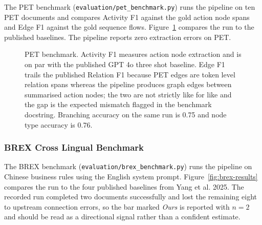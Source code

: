 \documentclass{article}
\begin{document}
The PET benchmark (\texttt{evaluation/pet\_benchmark.py}) runs the
pipeline on ten PET documents and compares Activity F1 against the
gold action node spans and Edge F1 against the gold sequence flows.
Figure~\ref{fig:pet-results} compares the run to the published
baselines. The pipeline reports zero extraction errors on PET.

\begin{figure}[H]
\centering
{}
\caption{PET benchmark. Activity F1 measures action node extraction
and is on par with the published GPT 4o three shot baseline. Edge
F1 trails the published Relation F1 because PET edges are
token level relation spans whereas the pipeline produces graph
edges between summarised action nodes; the two are not strictly
like for like and the gap is the expected mismatch flagged in the
benchmark docstring. Branching accuracy on the same run is 0.75
and node type accuracy is 0.76.}
\label{fig:pet-results}
\end{figure}

\subsubsection{BREX Cross Lingual Benchmark}

The BREX benchmark (\texttt{evaluation/brex\_benchmark.py}) runs the
pipeline on Chinese business rules using the English system prompt.
Figure~\ref{fig:brex-results} compares the run to the four published
baselines from Yang et al. 2025. The recorded run completed two
documents successfully and lost the remaining eight to upstream
connection errors, so the bar marked \emph{Ours} is reported with
$n = 2$ and should be read as a directional signal rather than a
confident estimate.
\end{document}
